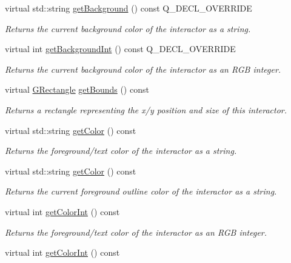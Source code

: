 \begin{DoxyCompactItemize}
virtual std\+::string \mbox{\hyperlink{classGCanvas_ab44f928b6bd7c8e4b82d5ed92bc3d4c6}{get\+Background}} () const Q\+\_\+\+D\+E\+C\+L\+\_\+\+O\+V\+E\+R\+R\+I\+DE
\begin{DoxyCompactList}\small\item\em Returns the current background color of the interactor as a string. \end{DoxyCompactList}\item 
virtual int \mbox{\hyperlink{classGCanvas_af66f525e8154dbc8dcd2daecf3728ba9}{get\+Background\+Int}} () const Q\+\_\+\+D\+E\+C\+L\+\_\+\+O\+V\+E\+R\+R\+I\+DE
\begin{DoxyCompactList}\small\item\em Returns the current background color of the interactor as an R\+GB integer. \end{DoxyCompactList}\item 
virtual \mbox{\hyperlink{classGRectangle}{G\+Rectangle}} \mbox{\hyperlink{classGInteractor_a29e6ac35a0b48f491a4c88194cc5da3b}{get\+Bounds}} () const
\begin{DoxyCompactList}\small\item\em Returns a rectangle representing the x/y position and size of this interactor. \end{DoxyCompactList}\item 
virtual std\+::string \mbox{\hyperlink{classGInteractor_aa061dfa488c31e18549d64363c1d0e34}{get\+Color}} () const
\begin{DoxyCompactList}\small\item\em Returns the foreground/text color of the interactor as a string. \end{DoxyCompactList}\item 
virtual std\+::string \mbox{\hyperlink{classGDrawingSurface_aa061dfa488c31e18549d64363c1d0e34}{get\+Color}} () const
\begin{DoxyCompactList}\small\item\em Returns the current foreground outline color of the interactor as a string. \end{DoxyCompactList}\item 
virtual int \mbox{\hyperlink{classGInteractor_a9635c7af766cdc3417f346683fa0e6c1}{get\+Color\+Int}} () const
\begin{DoxyCompactList}\small\item\em Returns the foreground/text color of the interactor as an R\+GB integer. \end{DoxyCompactList}\item 
virtual int \mbox{\hyperlink{classGDrawingSurface_a9635c7af766cdc3417f346683fa0e6c1}{get\+Color\+Int}} () const

\end{DoxyCompactItemize}
